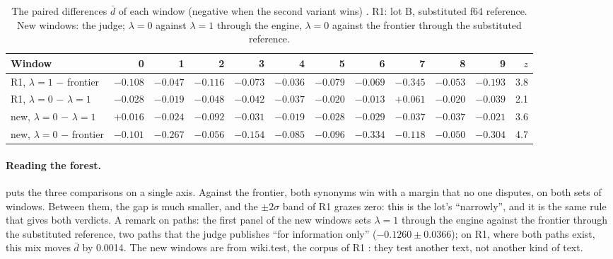 \begin{table}[ht]
\centering\footnotesize
\caption[The paired differences, window by window]{The paired differences $\bar d$ of each window (negative when the second variant wins) \mes. R1: lot B, substituted f64 reference. New windows: the judge; $\lambda = 0$ against $\lambda = 1$ through the engine, $\lambda = 0$ against the frontier through the substituted reference.}
\label{t3sno:tab:fenetres}
\setlength{\tabcolsep}{2.6pt}
\begin{tabular}{@{}lrrrrrrrrrr|r@{}}
\toprule
Window & 0 & 1 & 2 & 3 & 4 & 5 & 6 & 7 & 8 & 9 & $z$ \\
\midrule
R1, $\lambda = 1$ − frontier & $-0.108$ & $-0.047$ & $-0.116$ & $-0.073$ & $-0.036$ & $-0.079$ & $-0.069$ & $-0.345$ & $-0.053$ & $-0.193$ & \num{3.8} \\
R1, $\lambda = 0$ − $\lambda = 1$ & $-0.028$ & $-0.019$ & $-0.048$ & $-0.042$ & $-0.037$ & $-0.020$ & $-0.013$ & $+0.061$ & $-0.020$ & $-0.039$ & \num{2.1} \\
new, $\lambda = 0$ − $\lambda = 1$ & $+0.016$ & $-0.024$ & $-0.092$ & $-0.031$ & $-0.019$ & $-0.028$ & $-0.029$ & $-0.037$ & $-0.037$ & $-0.021$ & \num{3.6} \\
new, $\lambda = 0$ − frontier & $-0.101$ & $-0.267$ & $-0.056$ & $-0.154$ & $-0.085$ & $-0.096$ & $-0.334$ & $-0.118$ & $-0.050$ & $-0.304$ & \num{4.7} \\
\bottomrule
\end{tabular}
\end{table}

\begin{figure}[tbp]
\centering
\GrapheSynoForet
{}
\label{fig:t3-syno-foret}
\end{figure}

\paragraph{Reading the forest.}  puts the three comparisons on a single axis. Against the frontier, both synonyms win with a margin that no one disputes, on both sets of windows. Between them, the gap is much smaller, and the $\pm 2\sigma$ band of R1 grazes zero: this is the lot's ``narrowly'', and it is the same rule that gives both verdicts. A remark on paths: the first panel of the new windows sets $\lambda = 1$ through the engine against the frontier through the substituted reference, two paths that the judge publishes ``for information only'' ($-\num{0.1260} \pm \num{0.0366}$); on R1, where both paths exist, this mix moves $\bar d$ by \num{0.0014}. The new windows are from wiki.test, the corpus of R1 \parencite{merity2016wikitext}: they test another text, not another kind of text.

